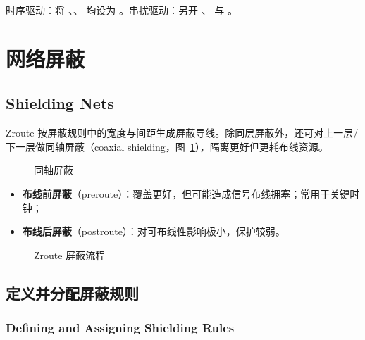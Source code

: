 时序驱动：将 、、 均设为 。串扰驱动：另开 、 与 。

\section{网络屏蔽}
\subsection*{Shielding Nets}

Zroute 按屏蔽规则中的宽度与间距生成屏蔽导线。除同层屏蔽外，还可对上一层/下一层做同轴屏蔽（coaxial shielding，图~\ref{fig:coaxial-shield}），隔离更好但更耗布线资源。

\begin{figure}[htbp]
\centering
{}
\caption{同轴屏蔽}
\label{fig:coaxial-shield}
\end{figure}

\begin{itemize}
  \item \textbf{布线前屏蔽}（preroute）：覆盖更好，但可能造成信号布线拥塞；常用于关键时钟；
  \item \textbf{布线后屏蔽}（postroute）：对可布线性影响极小，保护较弱。
\end{itemize}

\begin{figure}[htbp]
\centering
{}
\caption{Zroute 屏蔽流程}
\label{fig:shield-flow}
\end{figure}

\subsection{定义并分配屏蔽规则}
\subsubsection*{Defining and Assigning Shielding Rules}


